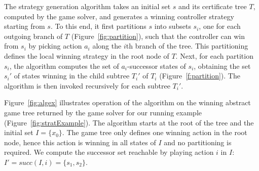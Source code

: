The strategy generation algorithm takes an initial set $s$ and its certificate tree $T$, computed by the game solver, and generates a winning controller strategy starting from $s$.  To this end, it first partitions $s$ into subsets $s_i$, one for each outgoing branch of $T$ (Figure~\ref{fig:partition}), such that the controller can win from $s_i$ by picking action $a_i$ along the $i$th branch of the tree.  This partitioning defines the local winning strategy in the root node of $T$.  Next, for each partition $s_i$, the algorithm computes the set of $a_i$-successor states of $s_i$, obtaining the set $s_i'$ of states winning in the child subtree $T_i'$ of $T_i$ (Figure~\ref{f:partition}).  The algorithm is then invoked recursively for each subtree $T_i'$.

\begin{example}
Figure~\ref{fig:algex} illustrates operation of the algorithm on the winning abstract game tree returned by the game solver for our running example (Figure~\ref{fig:stratExample}).  The algorithm starts at the root of the tree and the initial set $I=\{x_0\}$.  The game tree only defines one winning action in the root node, hence this action is winning in all states of $I$ and no partitioning is required.  We compute the successor set reachable by playing action $i$ in $I$: $I' = succ(I, i) = \{s_1, s_2\}$.



\end{example}
